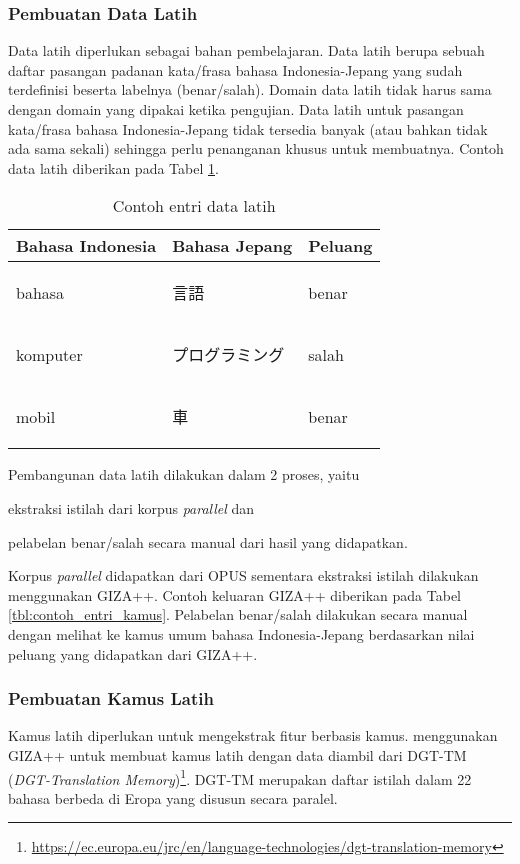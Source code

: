 \documentclass[../main/main.tex]{subfiles}
\begin{document}
\subsubsection{Pembuatan Data Latih}
Data latih diperlukan sebagai bahan pembelajaran. Data latih berupa sebuah daftar pasangan padanan kata/frasa bahasa Indonesia-Jepang yang sudah terdefinisi beserta labelnya (benar/salah). Domain data latih tidak harus sama dengan domain yang dipakai ketika pengujian. Data latih untuk pasangan kata/frasa bahasa Indonesia-Jepang tidak tersedia banyak (atau bahkan tidak ada sama sekali) sehingga perlu penanganan khusus untuk membuatnya. Contoh data latih diberikan pada Tabel \ref{tbl:contoh_entri_data_latih}.

\begin{table}[htbp]
	\centering
	\caption{Contoh entri data latih}
	\label{tbl:contoh_entri_data_latih}
	\begin{tabular}{|l|l|l|}
		\hline
		\textbf{Bahasa Indonesia} & \textbf{Bahasa Jepang} & \textbf{Peluang}\\ \hline
		bahasa & \begin{CJK}{UTF8}{min}言語\end{CJK} & benar\\ \hline
		komputer & \begin{CJK}{UTF8}{min}プログラミング\end{CJK} & salah\\ \hline
		mobil & \begin{CJK}{UTF8}{min}車\end{CJK} & benar\\ \hline
	\end{tabular}
\end{table}

Pembangunan data latih dilakukan dalam 2 proses, yaitu
\begin{inparaenum}[(1)]
\item ekstraksi istilah dari korpus \textit{parallel} dan
\item pelabelan benar/salah secara manual dari hasil yang didapatkan.
\end{inparaenum}
Korpus \textit{parallel} didapatkan dari OPUS sementara ekstraksi istilah dilakukan menggunakan GIZA++. Contoh keluaran GIZA++ diberikan pada Tabel \ref{tbl:contoh_entri_kamus}. Pelabelan benar/salah dilakukan secara manual dengan melihat ke kamus umum bahasa Indonesia-Jepang berdasarkan nilai peluang yang didapatkan dari GIZA++.

\subsubsection{Pembuatan Kamus Latih}
Kamus latih diperlukan untuk mengekstrak fitur berbasis kamus. \textcite{aker} menggunakan GIZA++ untuk membuat kamus latih dengan data diambil dari DGT-TM (\textit{DGT-Translation Memory})\footnote{\url{https://ec.europa.eu/jrc/en/language-technologies/dgt-translation-memory}}. DGT-TM merupakan daftar istilah dalam 22 bahasa berbeda di Eropa yang disusun secara paralel.
\end{document}
